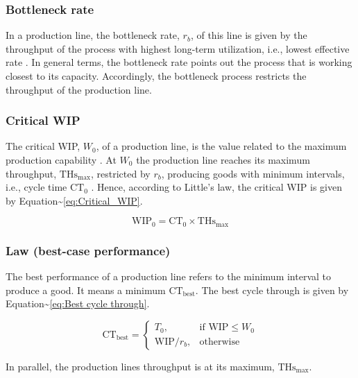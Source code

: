 \documentclass{article}
\begin{document}
\subsubsection{Bottleneck rate}
\label{sec:org3a44f7f}
In a production line, the bottleneck rate, \(r_b\), of this line is given by the throughput of the process with highest long-term utilization, i.e., lowest effective rate \citep{Hopp2001}.
In general terms, the bottleneck rate points out the process that is working closest to its capacity.
Accordingly, the bottleneck process restricts the throughput of the production line.

\subsubsection{Critical WIP}
\label{sec:orge65f969}

The critical WIP, \(W_0\), of a production line, is the value related to the maximum production capability \citep{Hopp2001}.
At \(W_0\) the production line reaches its maximum throughput, \(\mbox{THs}_{\mbox{max}}\), restricted by \(r_b\), producing goods with minimum intervals, i.e., cycle time \(\mbox{CT}_0\) \citep{Martin1998}.
Hence, according to Little's law, the critical WIP is given by Equation\textasciitilde{}\ref{eq:Critical_WIP}.

\label{eq:Critical_WIP}
\begin{equation} 
  \mbox{WIP}_0 = \mbox{CT}_0 \times \mbox{THs}_{\mbox{max}}
\end{equation}

\subsubsection{Law (best-case performance)}
\label{sec:org9a08509}

The best performance of a production line refers to the minimum interval to produce a good.
It means a minimum \(\mbox{CT}_{\mbox{best}}\).
The best cycle through is given by Equation\textasciitilde{}\ref{eq:Best cycle through}.

\begin{equation}\label{eq:Best cycle through}
    \mbox{CT}_{\mbox{best}}=
    \begin{cases}
 T_0,  & \mbox{if }\mbox{WIP} \le W_0\\
  \mbox{WIP}/r_b, & \mbox{otherwise }
    \end{cases}
\end{equation}

In parallel, the production lines throughput is at its maximum, \(\mbox{THs}_{\mbox{max}}\).
\end{document}
